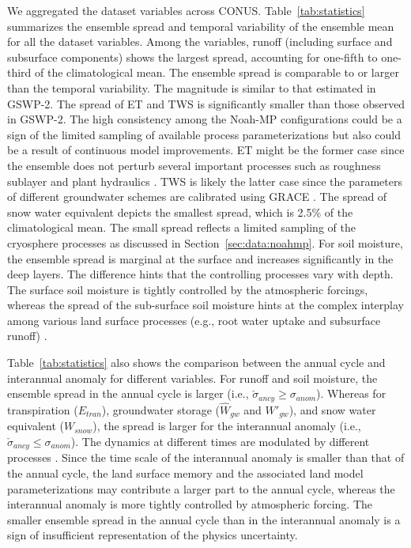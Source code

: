 \documentclass[essd, manuscript]{copernicus}
\begin{document}
We aggregated the dataset variables across CONUS\@. Table~\ref{tab:statistics} summarizes the ensemble spread and temporal variability of the ensemble mean for all the dataset variables. Among the variables, runoff (including surface and subsurface components) shows the largest spread, accounting for one-fifth to one-third of the climatological mean. The ensemble spread is comparable to or larger than the temporal variability. The magnitude is similar to that estimated in GSWP-2. The spread of ET and TWS is significantly smaller than those observed in GSWP-2. The high consistency among the Noah-MP configurations could be a sign of the limited sampling of available process parameterizations but also could be a result of continuous model improvements. ET might be the former case since the ensemble does not perturb several important processes such as roughness sublayer \citep{abolafia-rosenzweig2021JAMES} and plant hydraulics \citep{li2021JAMESa}. TWS is likely the latter case since the parameters of different groundwater schemes are calibrated using GRACE \citep{niu2007JGRa}. The spread of snow water equivalent depicts the smallest spread, which is 2.5\% of the climatological mean. The small spread reflects a limited sampling of the cryosphere processes as discussed in Section~\ref{sec:data:noahmp}. For soil moisture, the ensemble spread is marginal at the surface and increases significantly in the deep layers. The difference hints that the controlling processes vary with depth. The surface soil moisture is tightly controlled by the atmospheric forcings, whereas the spread of the sub-surface soil moisture hints at the complex interplay among various land surface processes (e.g., root water uptake and subsurface runoff) \citep{koster2015BAMS}.

Table~\ref{tab:statistics} also shows the comparison between the annual cycle and interannual anomaly for different variables. For runoff and soil moisture, the ensemble spread in the annual cycle is larger (i.e., \(\check{\sigma}_{ancy} \ge \sigma_{anom}\)). Whereas for transpiration (\(E_{tran}\)), groundwater storage (\(\hat{W}_{gw}\) and \(W'_{gw}\)), and snow water equivalent (\(W_{snow}\)), the spread is larger for the interannual anomaly (i.e., \(\check{\sigma}_{ancy} \le \sigma_{anom}\)). The dynamics at different times are modulated by different processes \citep{dickinson2003AAS}. Since the time scale of the interannual anomaly is smaller than that of the annual cycle, the land surface memory and the associated land model parameterizations may contribute a larger part to the annual cycle, whereas the interannual anomaly is more tightly controlled by atmospheric forcing. The smaller ensemble spread in the annual cycle than in the interannual anomaly is a sign of insufficient representation of the physics uncertainty.
\end{document}
